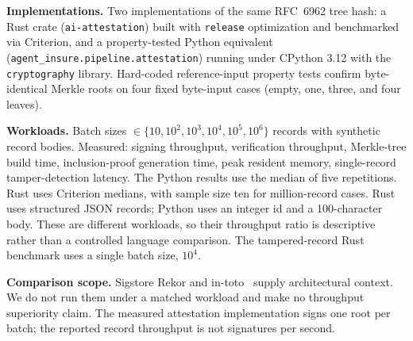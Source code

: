 \textbf{Implementations.} Two implementations of the same RFC~6962 tree hash: a Rust crate (\texttt{ai-attestation}) built with \texttt{release} optimization and benchmarked via Criterion, and a property-tested Python equivalent (\texttt{agent\_insure.pipeline.attestation}) running under CPython 3.12 with the \texttt{cryptography} library. Hard-coded reference-input property tests confirm byte-identical Merkle roots on four fixed byte-input cases (empty, one, three, and four leaves).

\textbf{Workloads.} Batch sizes $\in \{10, 10^2, 10^3, 10^4, 10^5, 10^6\}$ records with synthetic record bodies. Measured: signing throughput, verification throughput, Merkle-tree build time, inclusion-proof generation time, peak resident memory, single-record tamper-detection latency. The Python results use the median of five repetitions. Rust uses Criterion medians, with sample size ten for million-record cases. Rust uses structured JSON records; Python uses an integer id and a 100-character body. These are different workloads, so their throughput ratio is descriptive rather than a controlled language comparison. The tampered-record Rust benchmark uses a single batch size, $10^4$.

\textbf{Comparison scope.} Sigstore Rekor and in-toto~\cite{newman_2022_sigstore,torresarias_2019_intoto} supply architectural context. We do not run them under a matched workload and make no throughput superiority claim. The measured attestation implementation signs one root per batch; the reported record throughput is not signatures per second.
